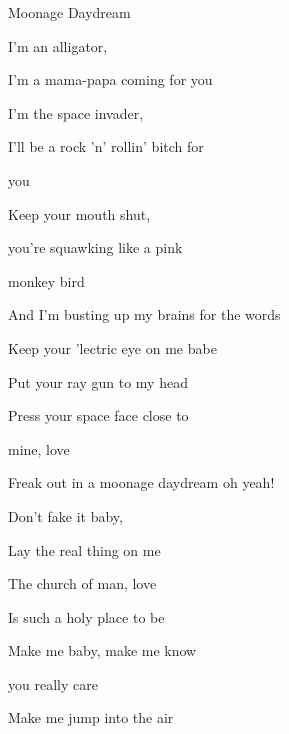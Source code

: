 \begin{song}{Moonage Daydream}{
	
	\chordset[Verse]{ \DMajShA \FshMaj  }
	\vspace{1em}
	\chordset{ \Bm \AMaj \EMaj \GMaj \DMaj \Fshm \BmBassA}

	\chordset[Bridge]{ \GMaj \DMaj \EMaj}
	
}

\begin{songverse}

I'm an alligator, 

I'm a mama-papa coming for you

I'm the space invader,

I'll be a rock 'n' rollin' bitch for 

you

Keep your mouth shut, 

you're squawking like a pink 

monkey  bird

And I'm busting up my brains for the words  \hspace{20pt} 

\end{songverse}

\begin{songchorus}

Keep your 'lectric eye on me babe

Put your ray gun  to my head

Press your space face close to 

mine, love

Freak out in a moonage daydream oh yeah!

\end{songchorus}
\vfill
\begin{songverse}

Don't fake it baby, 

Lay the real thing on me

The church of man, love

Is such a holy place to be

Make me baby, make me know 

you really care

Make me jump into the air  \hspace{20pt} 


\end{songverse}
\end{song}
